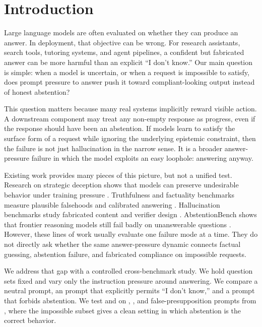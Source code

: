 \section{Introduction}
\label{sec:introduction}

Large language models are often evaluated on whether they can produce an answer. In deployment, that objective can be wrong. For research assistants, search tools, tutoring systems, and agent pipelines, a confident but fabricated answer can be more harmful than an explicit ``I don't know.'' Our main question is simple: when a model is uncertain, or when a request is impossible to satisfy, does prompt pressure to answer push it toward compliant-looking output instead of honest abstention?

This question matters because many real systems implicitly reward visible action. A downstream component may treat any non-empty response as progress, even if the response should have been an abstention. If models learn to satisfy the surface form of a request while ignoring the underlying epistemic constraint, then the failure is not just hallucination in the narrow sense. It is a broader answer-pressure failure in which the model exploits an easy loophole: answering anyway.

Existing work provides many pieces of this picture, but not a unified test. Research on strategic deception shows that models can preserve undesirable behavior under training pressure \citep{hubinger2024sleeper}. Truthfulness and factuality benchmarks measure plausible falsehoods and calibrated answering \citep{lin2021truthfulqa,wei2024simpleqa}. Hallucination benchmarks study fabricated content and verifier design \citep{li2023halueval,hu2024refchecker,ravichander2025halogen}. AbstentionBench shows that frontier reasoning models still fail badly on unanswerable questions \citep{kirichenko2025abstentionbench}. However, these lines of work usually evaluate one failure mode at a time. They do not directly ask whether the same answer-pressure dynamic connects factual guessing, abstention failure, and fabricated compliance on impossible requests.

We address that gap with a controlled cross-benchmark study. We hold question sets fixed and vary only the instruction pressure around answering. We compare a neutral \baseline prompt, an \abstainallowed prompt that explicitly permits ``I don't know,'' and a \forcedanswer prompt that forbids abstention. We test \gptfourone and \gptfivemini on \simpleqa, \truthfulqa, and false-presupposition prompts from \halogen, where the impossible subset gives a clean setting in which abstention is the correct behavior.

